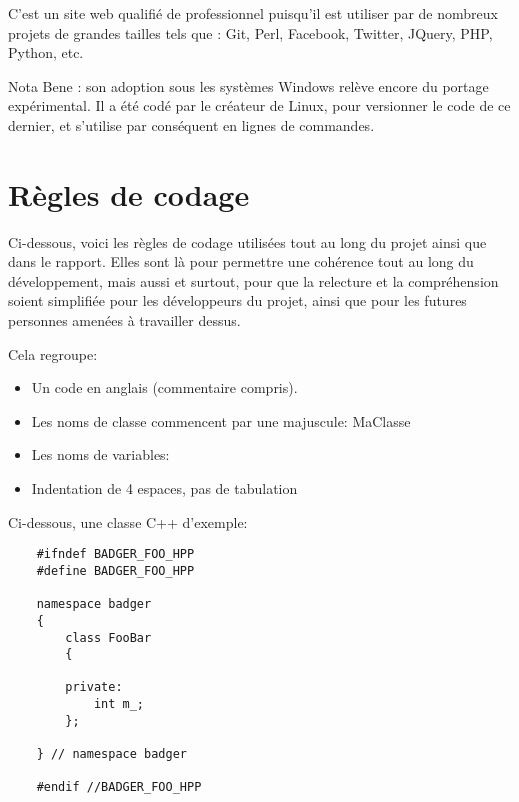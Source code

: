     C'est un site web qualifié de professionnel puisqu'il est utiliser par de 
    nombreux projets de grandes tailles tels que : Git, Perl, Facebook, Twitter,
    JQuery, PHP, Python, etc.

    Nota Bene : son adoption sous les systèmes Windows relève encore du portage
    expérimental. Il a été codé par le créateur de Linux, pour versionner le code
    de ce dernier, et s'utilise par conséquent en lignes de commandes.







    \section{Règles de codage}
        Ci-dessous, voici les règles de codage utilisées tout au long du projet
    ainsi que dans le rapport. Elles sont là pour permettre une cohérence tout au
    long du développement, mais aussi et surtout, pour que la relecture et la 
    compréhension soient simplifiée pour les développeurs du projet, ainsi que pour les
    futures personnes amenées à travailler dessus.

    Cela regroupe:
    \begin{itemize}
    \item Un code en anglais (commentaire compris).
    \item Les noms de classe commencent par une majuscule: MaClasse
    \item Les noms de variables: 
    \item Indentation de 4 espaces, pas de tabulation
    \end{itemize}

    Ci-dessous, une classe C++ d'exemple:

    \begin{lstlisting}
    #ifndef BADGER_FOO_HPP
    #define BADGER_FOO_HPP

    namespace badger
    {
        class FooBar
        {

        private:
            int m_;
        };

    } // namespace badger

    #endif //BADGER_FOO_HPP
    \end{lstlisting}




